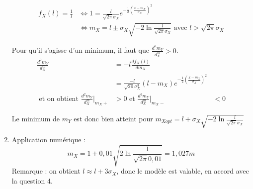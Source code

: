 \documentclass[main.tex]{subfiles}
\begin{document}
\begin{enumerate}
\begin{align*}
f_X(l) = \frac{1}{l} & \Leftrightarrow 1 = \frac{l}{\sqrt{2\pi}\sigma_X}e^{-\frac{1}{2}(\frac{x-m_X}{\sigma_X})^2} \\
& \Leftrightarrow m_X = l \pm \sigma_X\sqrt{-2\ln\frac{l}{\sqrt{2\pi}\sigma_X}} \text{ avec } l > \sqrt{2\pi}\sigma_X
\end{align*}

Pour qu'il s'agisse d'un minimum, il faut que $\frac{d^2m_Y}{d^m_X} > 0$.
\begin{align*}
\frac{d^2m_Y}{d^m_X} & = -l \frac{df_X(l)}{dm_X} \\
& = \frac{-l}{\sqrt{2\pi}\sigma_X^3}(l-m_X)e^{-\frac{1}{2}(\frac{x-m_X}{\sigma_X})^2} \\
\text{ et on obtient } \frac{d^2m_Y}{d^m_X}|_{m_X+} & > 0 \text{ et } \frac{d^2m_Y}{d^m_X}|_{m_X-} & < 0
\end{align*}

Le minimum de $m_Y$ est donc bien atteint pour $m_{Xopt} = l + \sigma_X\sqrt{-2\ln\frac{l}{\sqrt{2\pi}\sigma_X}}$

\item Application numérique : \\
\[ m_X = 1 + 0,01\sqrt{2\ln\frac{1}{\sqrt{2\pi}0,01}} = 1,027 m \]
Remarque : on obtient $l \approx l + 3\sigma_X$, donc le modèle est valable, en accord avec la question 4.
\end{enumerate}
\end{document}
